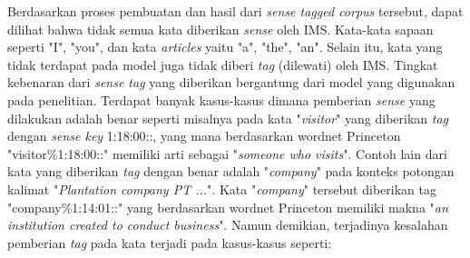Berdasarkan proses pembuatan dan hasil dari \textit{sense tagged corpus} tersebut, dapat dilihat bahwa tidak semua kata diberikan \textit{sense} oleh IMS. Kata-kata sapaan seperti "I", "you", dan kata \textit{articles} yaitu "a", "the", "an". Selain itu, kata yang tidak terdapat pada model juga tidak diberi \textit{tag} (dilewati) oleh IMS. Tingkat kebenaran dari \textit{sense tag} yang diberikan bergantung dari model yang digunakan pada penelitian. Terdapat banyak kasus-kasus dimana pemberian \textit{sense} yang dilakukan adalah benar seperti misalnya pada kata "\textit{visitor}" yang diberikan \textit{tag} dengan \textit{sense key} 1:18:00::, yang mana berdasarkan wordnet Princeton "visitor\%1:18:00::" memiliki arti sebagai "\textit{someone who visits}". Contoh lain dari kata yang diberikan \textit{tag} dengan benar adalah "\textit{company}" pada konteks potongan kalimat "\textit{Plantation company PT ...}". Kata "\textit{company}" tersebut diberikan tag "company\%1:14:01::" yang berdasarkan wordnet Princeton memiliki makna "\textit{an institution created to conduct business}". Namun demikian, terjadinya kesalahan pemberian \textit{tag} pada kata terjadi pada kasus-kasus seperti: 

